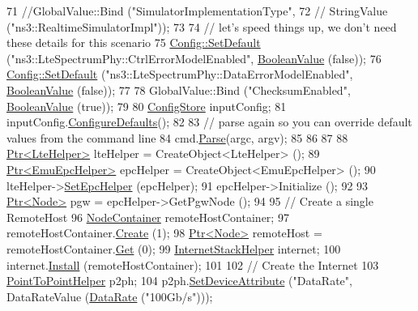 \begin{DoxyCode}
71   \textcolor{comment}{//GlobalValue::Bind ("SimulatorImplementationType", }
72   \textcolor{comment}{//                 StringValue ("ns3::RealtimeSimulatorImpl"));}
73 
74  \textcolor{comment}{// let's speed things up, we don't need these details for this scenario}
75   \hyperlink{group__config_ga2e7882df849d8ba4aaad31c934c40c06}{Config::SetDefault} (\textcolor{stringliteral}{"ns3::LteSpectrumPhy::CtrlErrorModelEnabled"}, 
      \hyperlink{classns3_1_1BooleanValue}{BooleanValue} (\textcolor{keyword}{false}));
76   \hyperlink{group__config_ga2e7882df849d8ba4aaad31c934c40c06}{Config::SetDefault} (\textcolor{stringliteral}{"ns3::LteSpectrumPhy::DataErrorModelEnabled"}, 
      \hyperlink{classns3_1_1BooleanValue}{BooleanValue} (\textcolor{keyword}{false}));  
77 
78   GlobalValue::Bind (\textcolor{stringliteral}{"ChecksumEnabled"}, \hyperlink{classns3_1_1BooleanValue}{BooleanValue} (\textcolor{keyword}{true}));
79 
80   \hyperlink{classns3_1_1ConfigStore}{ConfigStore} inputConfig;
81   inputConfig.\hyperlink{classns3_1_1ConfigStore_a0a6137574d7c847c3823af8b9d1bb886}{ConfigureDefaults}();
82 
83   \textcolor{comment}{// parse again so you can override default values from the command line}
84   cmd.\hyperlink{classns3_1_1CommandLine_a5c10b85b3207e5ecb48d907966923156}{Parse}(argc, argv);
85 
86 
87 
88   \hyperlink{classns3_1_1Ptr}{Ptr<LteHelper>} lteHelper = CreateObject<LteHelper> ();
89   \hyperlink{classns3_1_1Ptr}{Ptr<EmuEpcHelper>}  epcHelper = CreateObject<EmuEpcHelper> ();
90   lteHelper->\hyperlink{classns3_1_1LteHelper_a324079a1ccd54ce949786b83d6b95915}{SetEpcHelper} (epcHelper);
91   epcHelper->Initialize ();
92 
93   \hyperlink{classns3_1_1Ptr}{Ptr<Node>} pgw = epcHelper->GetPgwNode ();
94 
95    \textcolor{comment}{// Create a single RemoteHost}
96   \hyperlink{classns3_1_1NodeContainer}{NodeContainer} remoteHostContainer;
97   remoteHostContainer.\hyperlink{classns3_1_1NodeContainer_a787f059e2813e8b951cc6914d11dfe69}{Create} (1);
98   \hyperlink{classns3_1_1Ptr}{Ptr<Node>} remoteHost = remoteHostContainer.\hyperlink{classns3_1_1NodeContainer_a9ed96e2ecc22e0f5a3d4842eb9bf90bf}{Get} (0);
99   \hyperlink{classns3_1_1InternetStackHelper}{InternetStackHelper} internet;
100   internet.\hyperlink{classns3_1_1InternetStackHelper_a6645b412f31283d2d9bc3d8a95cebbc0}{Install} (remoteHostContainer);
101 
102   \textcolor{comment}{// Create the Internet}
103   \hyperlink{classns3_1_1PointToPointHelper}{PointToPointHelper} p2ph;
104   p2ph.\hyperlink{classns3_1_1PointToPointHelper_a4577f5ab8c387e5528af2e0fbab1152e}{SetDeviceAttribute} (\textcolor{stringliteral}{"DataRate"}, DataRateValue (\hyperlink{classns3_1_1DataRate}{DataRate} (\textcolor{stringliteral}{"100Gb/s"})));

\end{DoxyCode}
